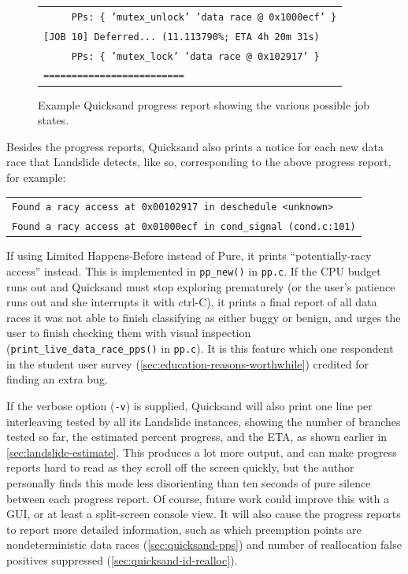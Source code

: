 \begin{figure}[t]
\begin{center}
\begin{tabular}{l}
		\texttt{~~~~ PPs: \{ 'mutex\_unlock' 'data race @ 0x1000ecf' \}} \\
		\texttt{[JOB 10] Deferred... (11.113790\%; ETA 4h 20m 31s)} \\
		\texttt{~~~~ PPs: \{ 'mutex\_lock' 'data race @ 0x102917' \}} \\
		\texttt{=========================} \\
	\end{tabular}
	\end{center}
	\caption{Example Quicksand progress report showing the various possible job states.}
	\label{fig:quicksand-progress}
\end{figure}

Besides the progress reports, Quicksand also prints a notice for each new data race that Landslide detects,
like so, corresponding to the above progress report, for example:
\begin{center}
	\begin{tabular}{l}
	{\tt Found a racy access at 0x00102917 in deschedule <unknown>} \\
	{\tt Found a racy access at 0x01000ecf in cond\_signal (cond.c:101)}
	\end{tabular}
\end{center}
If using Limited Happens-Before instead of Pure,
it prints ``potentially-racy access'' instead.
This is implemented in {\tt pp\_new()} in {\tt pp.c}.
If the CPU budget runs out and Quicksand must stop exploring prematurely
(or the user's patience runs out and she interrupts it with ctrl-C),
it prints a final report of all data races it was not able to finish classifying as either buggy or benign,
and urges the user to finish checking them with visual inspection
({\tt print\_live\_data\_race\_pps()} in {\tt pp.c}).
It is this feature which one respondent in the student user survey (\cref{sec:education-reasons-worthwhile})
credited for finding an extra bug.

If the verbose option ({\tt -v}) is supplied,
Quicksand will also print one line per interleaving tested by all its Landslide instances,
showing the number of branches tested so far, the estimated percent progress, and the ETA,
as shown earlier in \cref{sec:landslide-estimate}.
This produces a lot more output, and can make progress reports hard to read as they scroll off the screen quickly,
but the author personally finds this mode less disorienting than ten seconds of pure silence between each progress report.
Of course, future work could improve this with a GUI, or at least a split-screen console view.
It will also cause the progress reports to report more detailed information,
such as which preemption points are nondeterministic data races (\cref{sec:quicksand-pps})
and number of reallocation false positives suppressed (\cref{sec:quicksand-id-realloc}).

